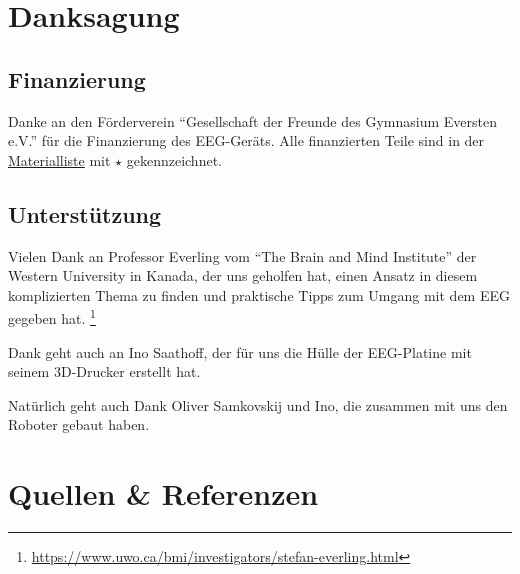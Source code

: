 \documentclass{scrartcl}
\begin{document}
	\section{Danksagung}

	\subsection{Finanzierung} \label{Foerderverein}

	Danke an den Förderverein \enquote{Gesellschaft der Freunde des Gymnasium Eversten e.V.} für die Finanzierung des EEG-Geräts. Alle finanzierten Teile sind in der \hyperref[Materialien]{Materialliste} mit $\star$ gekennzeichnet. 

	\subsection{Unterstützung}

	Vielen Dank an Professor Everling vom \enquote{The Brain and Mind Institute} der Western University in Kanada, der uns geholfen hat, einen Ansatz in diesem komplizierten Thema zu finden und praktische Tipps zum Umgang mit dem EEG gegeben hat. \footnote{\href{https://www.uwo.ca/bmi/investigators/stefan-everling.html}{https://www.uwo.ca/bmi/investigators/stefan-everling.html}}

	Dank geht auch an Ino Saathoff, der für uns die Hülle der EEG-Platine mit seinem 3D-Drucker erstellt hat.

	Natürlich geht auch Dank Oliver Samkovskij und Ino, die zusammen mit uns den Roboter gebaut haben.

	\section{Quellen \& Referenzen}

	\printbibliography[title={Literatur}, keyword={Literatur}, notkeyword={YTVideos}]

	\printbibliography[title={Videos}, keyword={YTVideos}]

	\printbibliography[title=Programme, keyword=Programme]
\end{document}
